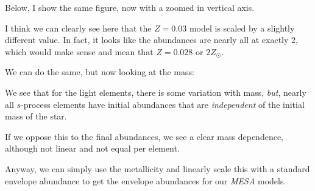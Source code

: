 \documentclass[a4paper,10pt]{article}
\begin{document}
Below, I show the same figure, now with a zoomed in vertical axis.

\begin{figure}[ht]
    \centering
\end{figure}

I think we can clearly see here that the \(Z=0.03\) model is scaled by a slightly different value. In fact, it looks like the abundances are nearly all at exactly \(2\), which would make sense and mean that \(Z=0.028\) or \(2Z_\odot \).

We can do the same, but now looking at the mass:

\begin{figure}[ht]
    \centering
\end{figure}

We see that for the light elements, there is some variation with mass, \emph{but}, nearly all \(s\)-process elements have initial abundances that are \emph{independent} of the initial mass of the star.

If we oppose this to the final abundances, we see a clear mass dependence, although not linear and not equal per element.

\begin{figure}[ht]
    \centering
\end{figure}

Anyway, we can simply use the metallicity and linearly scale this with a standard envelope abundance to get the envelope abundances for our \emph{MESA} models.

\end{document}
